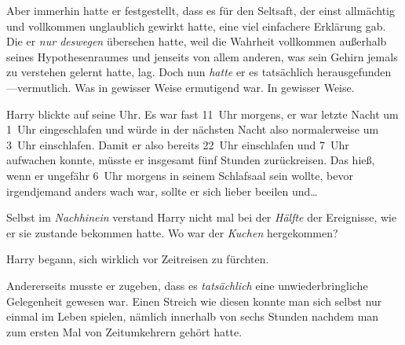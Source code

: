 Aber immerhin hatte er festgestellt, dass es für den Seltsaft, der einst allmächtig und vollkommen unglaublich gewirkt hatte, eine viel einfachere Erklärung gab. Die er \emph{nur deswegen} übersehen hatte, weil die Wahrheit vollkommen außerhalb seines Hypothesenraumes und jenseits von allem anderen, was sein Gehirn jemals zu verstehen gelernt hatte, lag. Doch nun \emph{hatte} er es tatsächlich herausgefunden—vermutlich. Was in gewisser Weise ermutigend war. In gewisser Weise.

Harry blickte auf seine Uhr. Es war fast 11~Uhr morgens, er war letzte Nacht um 1~Uhr eingeschlafen und würde in der nächsten Nacht also normalerweise um 3~Uhr einschlafen. Damit er also bereits 22~Uhr einschlafen und 7~Uhr aufwachen konnte, müsste er insgesamt fünf Stunden zurückreisen. Das hieß, wenn er ungefähr 6~Uhr morgens in seinem Schlafsaal sein wollte, bevor irgendjemand anders wach war, sollte er sich lieber beeilen und…

Selbst im \emph{Nachhinein} verstand Harry nicht mal bei der \emph{Hälfte} der Ereignisse, wie er sie zustande bekommen hatte. Wo war der \emph{Kuchen} hergekommen?

Harry begann, sich wirklich vor Zeitreisen zu fürchten.

Andererseits musste er zugeben, dass es \emph{tatsächlich} eine unwiederbringliche Gelegenheit gewesen war. Einen Streich wie diesen konnte man sich selbst nur einmal im Leben spielen, nämlich innerhalb von sechs Stunden nachdem man zum ersten Mal von Zeitumkehrern gehört hatte.

